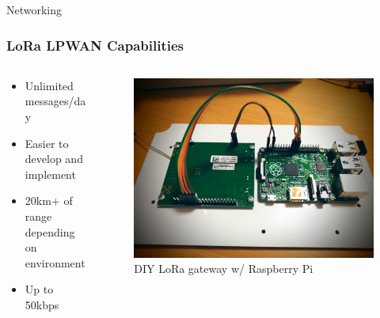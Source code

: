 \documentclass{beamer}
\begin{document}
  \begin{frame}{Networking}
    \frametitle{LoRa LPWAN Capabilities}
    \begin{columns}
      \begin{column}{0.5\textwidth}
        \begin{itemize}
          \item Unlimited messages/day
          \item Easier to develop and implement
          \item 20km+ of range depending on environment
          \item Up to 50kbps
        \end{itemize}
      \end{column}
      \begin{column}{0.5\textwidth}
        \begin{figure}[htbp]
          \centering
          \includegraphics[width=\textwidth]{DIYloraGateway.jpg}
          \caption{DIY LoRa gateway w/ Raspberry Pi \cite{DIYLoRa}}
          \label{fig:DIY_LoRa_Gateway}
        \end{figure}
      \end{column}
    \end{columns}
  \end{frame}
\end{document}
